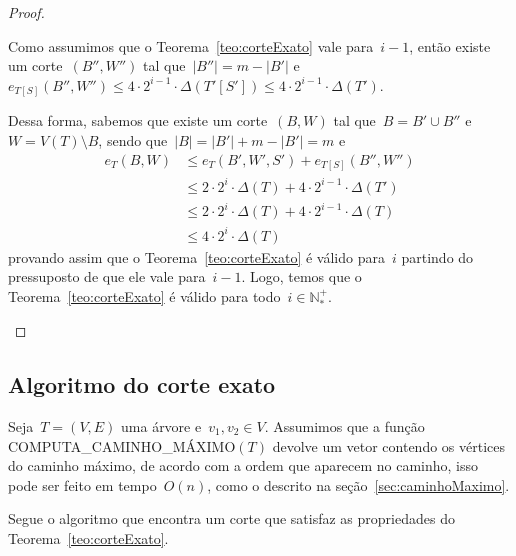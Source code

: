\documentclass[a4paper,12pt]{article}
\begin{document}
\begin{proof}
\begin{itemize}
			Como assumimos que o Teorema~\ref{teo:corteExato} vale
			para~$i-1$, então existe um corte~$(B'',W'')$
			tal que~$|B''|=m-|B'|$ 
			e~$e_{T[S]}(B'',W'')\le 4\cdot 2^{i-1}\cdot
			\Delta(T'[S'])\le 4\cdot 2^{i-1}\cdot\Delta(T')$.

			Dessa forma, sabemos que existe um corte~$(B,W)$ tal
			que~$B=B'\cup B''$ e~$W=V(T)\setminus B$, sendo 
			que~$|B|=|B'| + m-|B'| = m$ e
			\begin{align}
				e_T(B,W)&\le e_T(B',W',S') + e_{T[S]}(B'',W'') 
				\nonumber\\
				&\le 2\cdot2^i\cdot\Delta(T) + 4\cdot 2^{i-1}\cdot
				\Delta(T')\nonumber\\
				&\le 2\cdot2^i\cdot\Delta(T) + 4\cdot 2^{i-1}\cdot
				\Delta(T)\nonumber\\
				&\le 4\cdot 2^{i}\cdot\Delta(T) \nonumber
			\end{align}
			provando assim que o Teorema~\ref{teo:corteExato} é
			válido para~$i$ partindo do pressuposto de que ele vale
			para~$i-1$. Logo, temos que o 
			Teorema~\ref{teo:corteExato} é válido para 
			todo~$i\in \mathbb{N^+_*}$.
			
		\end{itemize}
	\end{proof}

	\bigskip
	\bigskip
	\bigskip
	\bigskip
	\bigskip

	\subsection{Algoritmo do corte exato}

		Seja~$T=(V,E)$ uma árvore e~$v_1,v_2\in V$.
		Assumimos que a função COMPUTA\_CAMINHO\_MÁXIMO$(T)$ 
		devolve um vetor contendo os vértices do caminho 
		máximo, de acordo com a ordem que aparecem no caminho, 
		isso pode ser feito em tempo~$O(n)$, como o descrito na 
		seção~\ref{sec:caminhoMaximo}.


		Segue o algoritmo que encontra um corte que satisfaz as 
		propriedades do Teorema~\ref{teo:corteExato}.
		
\end{document}
